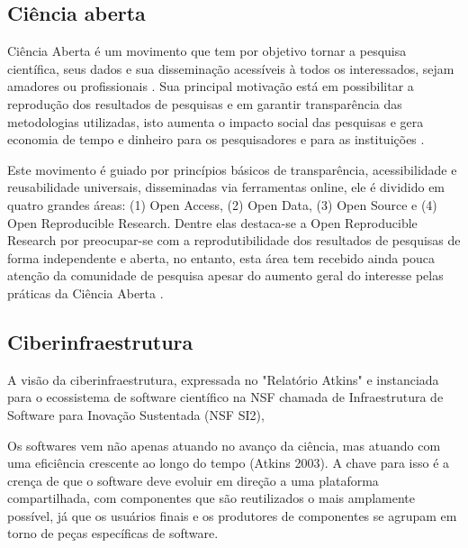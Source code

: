 
\subsection{Ciência aberta}

Ciência Aberta é um movimento que tem por objetivo tornar a pesquisa
científica, seus dados e sua disseminação acessíveis à todos os interessados,
sejam amadores ou profissionais \cite{WikipediaOpenScience}. Sua principal
motivação está em possibilitar a reprodução dos resultados de pesquisas e em
garantir transparência das metodologias utilizadas, isto aumenta o impacto
social das pesquisas e gera economia de tempo e dinheiro para os pesquisadores
e para as instituições \cite{Nesta2010}.

Este movimento é guiado por princípios básicos de transparência, acessibilidade
e reusabilidade universais, disseminadas via ferramentas online, ele é dividido
em quatro grandes áreas: (1) Open Access, (2) Open Data, (3) Open Source e (4)
Open Reproducible Research. Dentre elas destaca-se a Open Reproducible Research
por preocupar-se com a reprodutibilidade dos resultados de pesquisas de forma
independente \cite{Stodden2009} e aberta, no entanto, esta área tem recebido
ainda pouca atenção da comunidade de pesquisa \cite{Nancy2015}
\cite{Grand2010Open} apesar do aumento geral do interesse pelas práticas da
Ciência Aberta \cite{Grand2010}.

\subsection{Ciberinfraestrutura}

A visão da ciberinfraestrutura, expressada no "Relatório Atkins" e instanciada
para o ecossistema de software científico na NSF chamada de Infraestrutura de
Software para Inovação Sustentada (NSF SI2),

Os softwares vem não apenas atuando no avanço da ciência, mas atuando com uma
eficiência crescente ao longo do tempo (Atkins 2003). A chave para isso é a
crença de que o software deve evoluir em direção a uma plataforma
compartilhada, com componentes que são reutilizados o mais amplamente possível,
já que os usuários finais e os produtores de componentes se agrupam em torno de
peças específicas de software.

